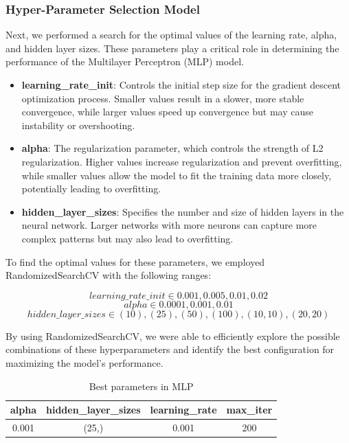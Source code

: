 \subsubsection{Hyper-Parameter Selection Model}

Next, we performed a search for the optimal values of the learning rate, alpha, and hidden layer sizes. These parameters play a critical role in determining the performance of the Multilayer Perceptron (MLP) model.

\begin{itemize} 
    \item \textbf{learning\_rate\_init}: Controls the initial step size for the gradient descent optimization process. Smaller values result in a slower, more stable convergence, while larger values speed up convergence but may cause instability or overshooting. 
    \item \textbf{alpha}: The regularization parameter, which controls the strength of L2 regularization. Higher values increase regularization and prevent overfitting, while smaller values allow the model to fit the training data more closely, potentially leading to overfitting. 
    
    \item \textbf{hidden\_layer\_sizes}: Specifies the number and size of hidden layers in the neural network. Larger networks with more neurons can capture more complex patterns but may also lead to overfitting. 
\end{itemize}

To find the optimal values for these parameters, we employed RandomizedSearchCV with the following ranges:

\begin{equation} learning\_rate\_init \in {0.001, 0.005, 0.01, 0.02} \end{equation} \begin{equation} alpha \in {0.0001, 0.001, 0.01} \end{equation} 
\begin{equation} hidden\_layer\_sizes \in {(10), (25), (50), (100), (10, 10), (20, 20)} \end{equation}

By using RandomizedSearchCV, we were able to efficiently explore the possible combinations of these hyperparameters and identify the best configuration for maximizing the model's performance.

\begin{table}[ht]
    \centering
    \caption{Best parameters in MLP} 
    \begin{tabular}{||c c c c||} 
     \hline
     alpha & hidden\_layer\_sizes & learning\_rate & max\_iter  \\ [0.5ex] 
     \hline\hline
     0.001 & (25,) & 0.001 & 200 \\ 
    \hline
    \end{tabular}
    \label{tab:tab2_mlp}
\end{table}

